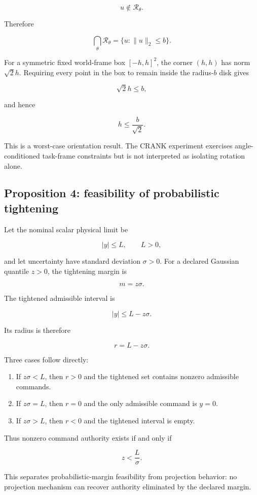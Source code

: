 \documentclass[10pt]{article}
\begin{document}
\[
u\notin\mathcal{R}_{\theta}.
\]

Therefore

\[
\bigcap_{\theta}\mathcal{R}_{\theta}
=
\{u:\lVert u\rVert_2\leq b\}.
\]

For a symmetric fixed world-frame box $[-h,h]^2$, the corner
$(h,h)$ has norm $\sqrt{2}h$. Requiring every point in the box to remain
inside the radius-$b$ disk gives

\[
\sqrt{2}h\leq b,
\]

and hence

\[
h\leq\frac{b}{\sqrt{2}}.
\]

This is a worst-case orientation result. The CRANK experiment exercises
angle-conditioned task-frame constraints but is not interpreted as isolating
rotation alone.


\subsection*{Proposition 4: feasibility of probabilistic tightening}

Let the nominal scalar physical limit be

\[
|y|\leq L,
\qquad
L>0,
\]

and let uncertainty have standard deviation $\sigma>0$. For a declared
Gaussian quantile $z>0$, the tightening margin is

\[
m=z\sigma.
\]

The tightened admissible interval is

\[
|y|\leq L-z\sigma.
\]

Its radius is therefore

\[
r=L-z\sigma.
\]

Three cases follow directly:

\begin{enumerate}
\item If $z\sigma<L$, then $r>0$ and the tightened set contains nonzero
      admissible commands.
\item If $z\sigma=L$, then $r=0$ and the only admissible command is $y=0$.
\item If $z\sigma>L$, then $r<0$ and the tightened interval is empty.
\end{enumerate}

Thus nonzero command authority exists if and only if

\[
z<\frac{L}{\sigma}.
\]

This separates probabilistic-margin feasibility from projection behavior: no
projection mechanism can recover authority eliminated by the declared margin.
\end{document}
